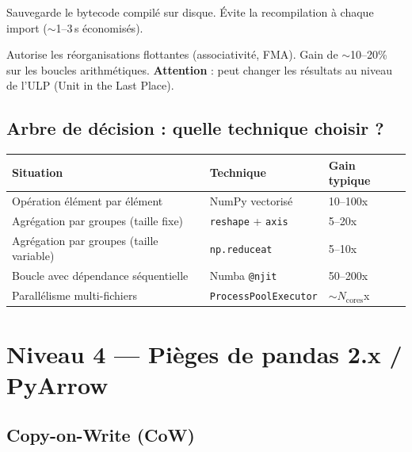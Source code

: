 \documentclass[11pt, a4paper]{article}
\begin{document}
\begin{keybox}
\begin{description}[leftmargin=2cm]
    \item[\texttt{cache=True}] Sauvegarde le bytecode compil\'e sur disque.
        \'Evite la recompilation \`a chaque import ($\sim$1--3\,s \'economis\'es).
    \item[\texttt{fastmath=True}] Autorise les r\'eorganisations flottantes
        (associativit\'e, FMA). Gain de $\sim$10--20\% sur les boucles arithm\'etiques.
        \textbf{Attention} : peut changer les r\'esultats au niveau de l'ULP
        (Unit in the Last Place).
\end{description}
\end{keybox}

\subsection{Arbre de d\'ecision : quelle technique choisir ?}

\begin{center}
\begin{tabular}{p{5cm}p{4cm}p{4cm}}
\toprule
\textbf{Situation} & \textbf{Technique} & \textbf{Gain typique} \\
\midrule
Op\'eration \'el\'ement par \'el\'ement & NumPy vectoris\'e & 10--100x \\
Agr\'egation par groupes (taille fixe) & \texttt{reshape} + \texttt{axis} & 5--20x \\
Agr\'egation par groupes (taille variable) & \texttt{np.reduceat} & 5--10x \\
Boucle avec d\'ependance s\'equentielle & Numba \texttt{@njit} & 50--200x \\
Parall\'elisme multi-fichiers & \texttt{ProcessPoolExecutor} & $\sim N_{\text{cores}}$x \\
\bottomrule
\end{tabular}
\end{center}


\section{Niveau 4 --- Pi\`eges de pandas 2.x / PyArrow}

\subsection{Copy-on-Write (CoW)}
\end{document}
